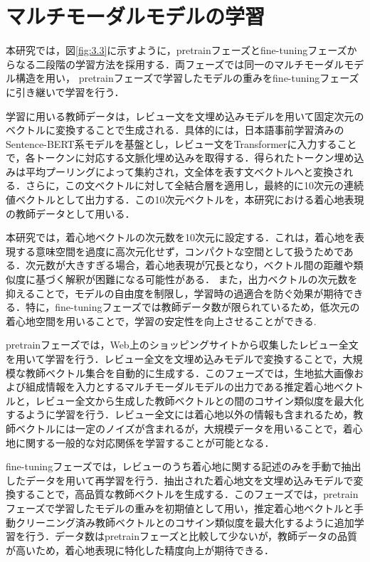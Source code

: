 \documentclass[a4paper,12pt]{jreport}
\begin{document}
\section{マルチモーダルモデルの学習}

本研究では，図\ref{fig:3.3}に示すように，pretrainフェーズとfine-tuningフェーズからなる二段階の学習方法を採用する．両フェーズでは同一のマルチモーダルモデル構造を用い， pretrainフェーズで学習したモデルの重みをfine-tuningフェーズに引き継いで学習を行う．

学習に用いる教師データは，レビュー文を文埋め込みモデルを用いて固定次元のベクトルに変換することで生成される．具体的には，日本語事前学習済みのSentence-BERT\cite{Reimers}系モデルを基盤とし，レビュー文をTransformerに入力することで，各トークンに対応する文脈化埋め込みを取得する．得られたトークン埋め込みは平均プーリングによって集約され，文全体を表す文ベクトルへと変換される．さらに，この文ベクトルに対して全結合層を適用し，最終的に10次元の連続値ベクトルとして出力する．この10次元ベクトルを，本研究における着心地表現の教師データとして用いる．

本研究では，着心地ベクトルの次元数を10次元に設定する．これは，着心地を表現する意味空間を過度に高次元化せず，コンパクトな空間として扱うためである．次元数が大きすぎる場合，着心地表現が冗長となり，ベクトル間の距離や類似度に基づく解釈が困難になる可能性がある．
また，出力ベクトルの次元数を抑えることで，モデルの自由度を制限し，学習時の過適合を防ぐ効果が期待できる．特に，fine-tuningフェーズでは教師データ数が限られているため，低次元の着心地空間を用いることで，学習の安定性を向上させることができる.

pretrainフェーズでは，Web上のショッピングサイトから収集したレビュー全文を用いて学習を行う．レビュー全文を文埋め込みモデルで変換することで，大規模な教師ベクトル集合を自動的に生成する．このフェーズでは，生地拡大画像および組成情報を入力とするマルチモーダルモデルの出力である推定着心地ベクトルと，レビュー全文から生成した教師ベクトルとの間のコサイン類似度を最大化するように学習を行う．レビュー全文には着心地以外の情報も含まれるため，教師ベクトルには一定のノイズが含まれるが，大規模データを用いることで，着心地に関する一般的な対応関係を学習することが可能となる．

fine-tuningフェーズでは，レビューのうち着心地に関する記述のみを手動で抽出したデータを用いて再学習を行う．抽出された着心地文を文埋め込みモデルで変換することで，高品質な教師ベクトルを生成する．このフェーズでは，pretrainフェーズで学習したモデルの重みを初期値として用い，推定着心地ベクトルと手動クリーニング済み教師ベクトルとのコサイン類似度を最大化するように追加学習を行う．データ数はpretrainフェーズと比較して少ないが，教師データの品質が高いため，着心地表現に特化した精度向上が期待できる．
\end{document}
